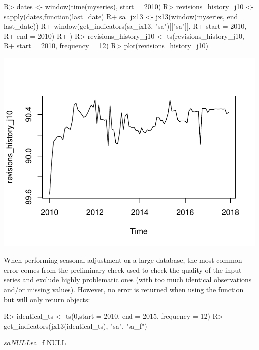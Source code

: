 \documentclass[article]{jss}
\begin{document}
\begin{CodeChunk}

\begin{CodeInput}
R> dates <- window(time(myseries), start = 2010)
R> revisions_history_j10 <- sapply(dates,function(last_date){
R+   sa_jx13 <- jx13(window(myseries, end = last_date))
R+   window(get_indicators(sa_jx13, "sa")[["sa"]],
R+          start = 2010,
R+          end = 2010)
R+ })
R> revisions_history_j10 <- ts(revisions_history_j10,
R+                             start = 2010, frequency = 12)
R> plot(revisions_history_j10)
\end{CodeInput}


\begin{center}\includegraphics{img/img-unnamed-chunk-28-1} \end{center}

\end{CodeChunk}

When performing seasonal adjustment on a large database, the most common
error comes from the preliminary check used to check the quality of the
input series and exclude highly problematic ones (with too much
identical observations and/or missing values). However, no error is
returned when using the  function but
 will only return  objects:

\begin{CodeChunk}

\begin{CodeInput}
R> identical_ts <- ts(0,start = 2010, end = 2015, frequency = 12)
R> get_indicators(jx13(identical_ts), "sa", "sa_f")
\end{CodeInput}

\begin{CodeOutput}
$sa
NULL

$sa_f
NULL
\end{CodeOutput}
\end{CodeChunk}
\end{document}
